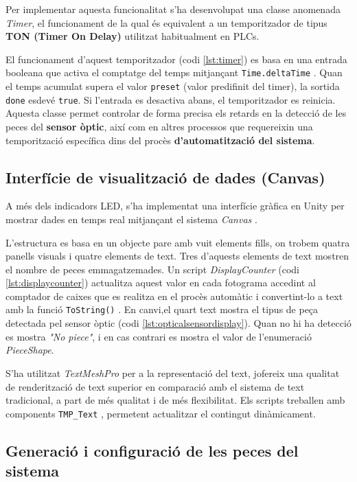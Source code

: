 \documentclass[a4paper,11pt,DIV=13,headings=normal,abstract=true,twoside=semi]{article}
\begin{document}
Per implementar aquesta funcionalitat s'ha desenvolupat una classe anomenada \textit{Timer}, el funcionament de la qual és equivalent a un temporitzador de tipus \textbf{TON (Timer On Delay)} utilitzat habitualment en PLCs.

El funcionament d'aquest temporitzador (codi \ref{lst:timer}) es basa en una entrada booleana que activa el comptatge del temps mitjançant \texttt{Time.deltaTime} \cite{UnityTime}. Quan el temps acumulat supera el valor \texttt{preset} (valor predifinit del timer), la sortida \texttt{done} esdevé \texttt{true}. Si l'entrada es desactiva abans, el temporitzador es reinicia. Aquesta classe permet controlar de forma precisa els retards en la detecció de les peces del \textbf{sensor òptic}, així com en altres processos que requereixin una temporització específica dins del procès \textbf{d'automatització del sistema}.


\subsection{Interfície de visualització de dades (Canvas)}

A més dels indicadors LED, s'ha implementat una interfície gràfica en Unity per mostrar dades en temps real mitjançant el sistema \textit{Canvas} \cite{UnityCanvas}.

L'estructura es basa en un objecte pare amb vuit elements fills, on trobem quatra panells visuals i quatre elements de text. Tres d'aquests elements de text mostren el nombre de peces emmagatzemades. Un script \textit{DisplayCounter} (codi \ref{lst:displaycounter}) actualitza aquest valor en cada fotograma accedint al comptador de caixes que es realitza en el procès automàtic i convertint-lo a text amb la funció \texttt{ToString()} \cite{dotnet_collections}. En canvi,el quart text mostra el tipus de peça detectada pel sensor òptic (codi \ref{lst:opticalsensordisplay}). Quan no hi ha detecció es mostra \textit{"No piece"}, i en cas contrari es mostra el valor de l'enumeració \textit{PieceShape}.

S'ha utilitzat \textit{TextMeshPro} per a la representació del text, jofereix una qualitat de renderització de text superior en comparació amb el sistema de text tradicional, a part de més qualitat i de més flexibilitat. Els scripts treballen amb components \texttt{TMP\_Text} \cite{dotnet_text}, permetent actualitzar el contingut dinàmicament. 

\subsection{Generació i configuració de les peces del sistema}
\end{document}
